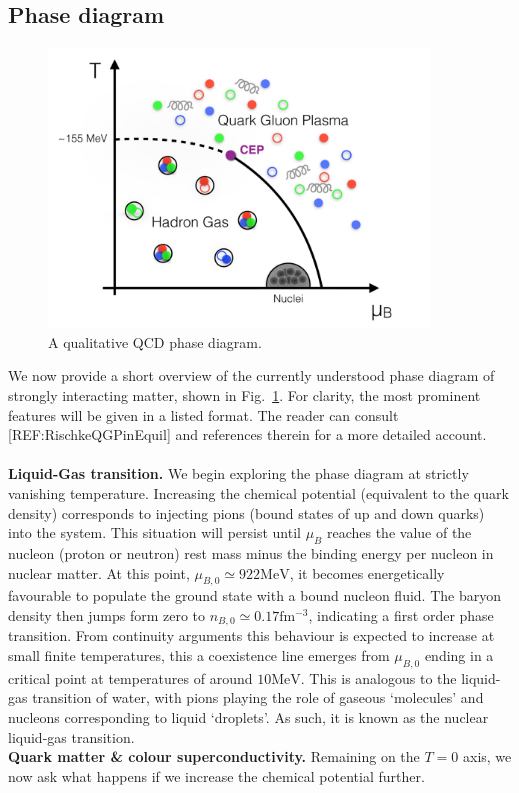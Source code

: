 \documentclass[12pt, a4paper, twoside]{book}
\begin{document}
\subsection{Phase diagram}
\label{sec:QCD_phase}
\begin{figure}[t]
	\centering
	\includegraphics[width=0.9\textwidth]{QCDphase}
	\caption{A qualitative QCD phase diagram.}\label{fig:QCDphasediag}
\end{figure}
We now provide a short overview of the currently understood phase diagram of strongly interacting matter, shown in Fig.~\ref{fig:QCDphasediag}. For clarity, the most prominent features will be given in a listed format. The reader can consult [REF:RischkeQGPinEquil] and references therein for a more detailed account.
\\
\\
\textbf{Liquid-Gas transition.} We begin exploring the phase diagram at strictly vanishing temperature. Increasing the chemical potential (equivalent to the quark density) corresponds to injecting pions (bound states of up and down quarks) into the system. This situation will persist until \(\mu_B\) reaches the value of the nucleon (proton or neutron) rest mass minus the binding energy per nucleon in nuclear matter. At this point, \(\mu_{B,0}\simeq 922\mathrm{MeV}\), it becomes energetically favourable to populate the ground state with a bound nucleon fluid. The baryon density then jumps form zero to \(n_{B,0}\simeq 0.17\mathrm{fm^{-3}}\), indicating a first order phase transition. From continuity arguments this behaviour is expected to increase at small finite temperatures, this a coexistence line emerges from \(\mu_{B,0}\) ending in a critical point at temperatures of around \(10\mathrm{MeV}\). This is analogous to the liquid-gas transition of water, with pions playing the role of gaseous `molecules' and nucleons corresponding to liquid `droplets'. As such, it is known as the nuclear liquid-gas transition.\\
\textbf{Quark matter \& colour superconductivity.} Remaining on the \(T=0\) axis, we now ask what happens if we increase the chemical potential further.
\end{document}
